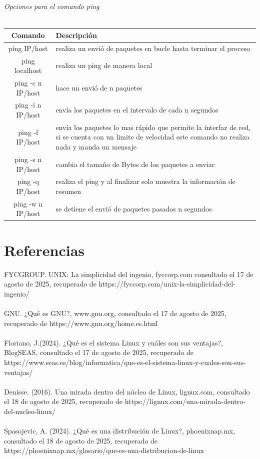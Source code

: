 \documentclass[10pt,a4paper,titlepage]{article}
\begin{document}
	\\
	\\
	\emph{Opciones para el comando ping}
	\\
	\\
	\begin{tabular}{|c|p{8cm}|}
		\hline
		Comando & Descripción \\
		\hline
		ping IP/host & realiza un envió de paquetes en bucle hasta terminar el proceso \\
		\hline
		ping localhost & realiza un ping de manera local \\
		\hline
		ping -c n IP/host & hace un envió de n paquetes  \\
		\hline
		ping -i n IP/host & envía los paquetes en el intervalo de cada n segundos  \\
		\hline
		ping -f IP/host & envía los paquetes lo mas rápido que permite la interfaz de red, si se cuenta con un limite de velocidad este comando no realiza nada y manda un mensaje \\
		\hline
		ping -s n IP/host & cambia el tamaño de Bytes de los paquetes a enviar \\
		\hline
		ping -q IP/host & realiza el ping y al finalizar solo muestra la información de resumen \\
		\hline
		ping -w n IP/host & se detiene el envió de paquetes pasados n segundos \\
		\hline
	\end{tabular}
	
	\section*{Referencias}
	FYCGROUP. UNIX: La simplicidad del ingenio, fyccorp.com consultado el 17 de agosto de 2025, recuperado de https://fyccorp.com/unix-la-simplicidad-del-ingenio/	
	\\
	\\
	GNU. ¿Qué es GNU?, www.gnu.org, consultado el 17 de agosto de 2025, recuperado de https://www.gnu.org/home.es.html
	\\
	\\
	Floriano, J.(2024). ¿Qué es el sistema Linux y cuáles son sus ventajas?, BlogSEAS, consultado el 17 de agosto de 2025, recuperado de https://www.seas.es/blog/informatica/que-es-el-sistema-linux-y-cuales-son-sus-ventajas/
	\\
	\\
	Denisse. (2016). Una mirada dentro del núcleo de Linux, lignux.com, consultado el 18 de agosto de 2025, recuperado de https://lignux.com/una-mirada-dentro-del-nucleo-linux/
	\\
	\\
	Spasojevic, A. (2024). ¿Qué es una distribución de Linux?, phoenixnap.mx, consultado el 18 de agosto de 2025, recuperado de https://phoenixnap.mx/glosario/que-es-una-distribucion-de-linux
	
\end{document}
